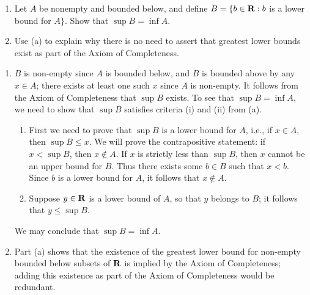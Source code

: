 \documentclass{lew98_solutions}
\begin{document}
\begin{exercise}
\label{ex:1.3.3}
    \begin{enumerate}
        \item Let \( A \) be nonempty and bounded below, and define \( B = \{ b \in \mathbf{R} : b \) is a lower bound for \( A \} \). Show that \( \sup B = \inf A \).

        \item Use (a) to explain why there is no need to assert that greatest lower bounds exist as part of the Axiom of Completeness.
    \end{enumerate}
\end{exercise}

\begin{solution}
    \begin{enumerate}
        \item \( B \) is non-empty since \( A \) is bounded below, and \( B \) is bounded above by any \( x \in A \); there exists at least one such \( x \) since \( A \) is non-empty. It follows from the Axiom of Completeness that \( \sup B \) exists. To see that \( \sup B = \inf A \), we need to show that \( \sup B \) satisfies criteria (i) and (ii) from  (a).
        \begin{enumerate}[label = (\roman*)]
            \item First we need to prove that \( \sup B \) is a lower bound for \( A \), i.e., if \( x \in A \), then \( \sup B \leq x \). We will prove the contrapositive statement: if \( x < \sup B \), then \( x \not\in A \). If \( x \) is strictly less than \( \sup B \), then \( x \) cannot be an upper bound for \( B \). Thus there exists some \( b \in B \) such that \( x < b \). Since \( b \) is a lower bound for \( A \), it follows that \( x \not\in A \).
    
            \item Suppose \( y \in \mathbf{R} \) is a lower bound of \( A \), so that \( y \) belongs to \( B \); it follows that \( y \leq \sup B \).
        \end{enumerate}
        We may conclude that \( \sup B = \inf A \).

        \item Part (a) shows that the existence of the greatest lower bound for non-empty bounded below subsets of \( \mathbf{R} \) is implied by the Axiom of Completeness; adding this existence as part of the Axiom of Completeness would be redundant.
    \end{enumerate}
\end{solution}
\end{document}
